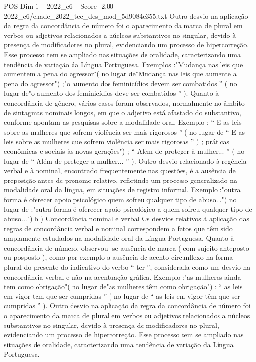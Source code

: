 \begin{textsample}{POS Dim 1 – 2022\_c6 – Score -2.00 – 2022\_c6/enade\_2022\_tec\_des\_mod\_5d9084e355.txt}
Outro desvio na aplicação da regra da concordância de número foi o aparecimento da marca de plural em verbos ou adjetivos relacionados a núcleos substantivos no singular, devido à presença de modificadores no plural, evidenciando um processo de hipercorreção.
Esse processo tem se ampliado nas situações de oralidade, caracterizando uma tendência de variação da Língua Portuguesa.
Exemplos :"Mudança nas leis que aumentem a pena do agressor"( no lugar de"Mudança nas leis que aumente a pena do agressor") ;"o aumento dos feminicídios devem ser combatidos ” ( no lugar de"o aumento dos feminicídios deve ser combatidos ” ).
Quanto à concordância de gênero, vários casos foram observados, normalmente no âmbito de sintagmas nominais longos, em que o adjetivo está afastado do substantivo, conforme apontam as pesquisas sobre a modalidade oral.
Exemplo : “ E as leis sobre as mulheres que sofrem violência ser mais rigorosos ” ( no lugar de “ E as leis sobre as mulheres que sofrem violência ser mais rigorosas ” ) ; práticas econômicas e sociais às novas gerações") ; “ Além de proteger à mulher... ” ( no lugar de “ Além de proteger a mulher... ” ).
Outro desvio relacionado à regência verbal e à nominal, encontrado frequentemente nas questões, é a ausência de preposição antes de pronome relativo, refletindo um processo generalizado na modalidade oral da língua, em situações de registro informal.
Exemplo :"outra forma é oferecer apoio psicológico quem sofreu qualquer tipo de abuso..."( no lugar de :"outra forma é oferecer apoio psicológico a quem sofreu qualquer tipo de abuso...") b ) Concordância nominal e verbal Os desvios relativos à aplicação das regras de concordância verbal e nominal correspondem a fatos que têm sido amplamente estudados na modalidade oral da Língua Portuguesa.
Quanto à concordância de número, observou -se ausência de marca ( com sujeito anteposto ou posposto ), como por exemplo a ausência de acento circunflexo na forma plural do presente do indicativo do verbo “ ter ”, considerada como um desvio na concordância verbal e não na acentuação gráfica.
Exemplo :"as mulheres ainda tem como obrigação"( no lugar de"as mulheres têm como obrigação") ; “ as leis em vigor tem que ser cumpridas ” ( no lugar de “ as leis em vigor têm que ser cumpridas ” ).
Outro desvio na aplicação da regra da concordância de número foi o aparecimento da marca de plural em verbos ou adjetivos relacionados a núcleos substantivos no singular, devido à presença de modificadores no plural, evidenciando um processo de hipercorreção.
Esse processo tem se ampliado nas situações de oralidade, caracterizando uma tendência de variação da Língua Portuguesa.

\end{textsample}
